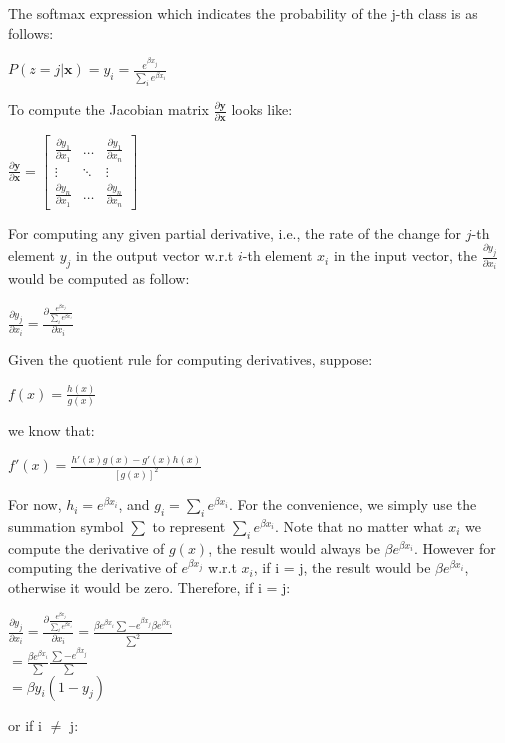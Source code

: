 \documentclass[12pt]{article}
\begin{document}
The softmax expression which indicates the probability of the j-th class is as follows:
\begin{center}
    $P(z=j|\mathbf{x}) = y_{i} = \frac{e^{\beta x_{j}}}{\sum_{i}e^{\beta x_{i}}}$
\end{center}To compute the Jacobian matrix $\frac{\partial \mathbf{y}}{\partial \mathbf{x}}$ looks like:
\begin{center}
    $
    \frac{\partial \mathbf{y}}{\partial \mathbf{x}}=
        \left[\begin{matrix}
        \frac{\partial y_{1}}{\partial x_{1}} & \dots & \frac{\partial y_{1}}{\partial x_{n}} \\
        \vdots & \ddots & \vdots \\
        \frac{\partial y_{n}}{\partial x_{1}} & \dots & \frac{\partial y_{n}}{\partial x_{n}}
        \end{matrix}\right]
    $
\end{center}For computing any given partial derivative, i.e., the rate of the change for $j$-th element $y_{j}$ in the output vector w.r.t $i$-th element $x_{i}$ in the input vector, the $\frac{\partial y_{j}}{\partial x_{i}}$ would be computed as follow:
\begin{center}
    $
    \frac{\partial y_{j}}{\partial x_{i}}=
    \frac{\partial \frac{e^{\beta x_{j}}}{\sum_{i}e^{\beta x_{i}}}}{\partial x_{i}}
    $
\end{center}Given the quotient rule for computing derivatives, suppose:
\begin{center}
    $
    f(x) = \frac{h(x)}{g(x)}
    $
\end{center}we know that:
\begin{center}
    $
    f'(x) = \frac{h'(x)g(x)-g'(x)h(x)}{[g(x)]^2}
    $
\end{center}For now, $h_i = e^{\beta x_{i}}$, and $g_i = \sum_{i}e^{\beta x_{i}}$. For the convenience, we simply use the summation symbol $\sum$ to represent $\sum_{i}e^{\beta x_{i}}$. Note that no matter what $x_{i}$ we compute the derivative of $g(x)$, the result would always be $\beta e^{\beta x_{i}}$. However for computing the derivative of $e^{\beta x_{j}}$ w.r.t $x_{i}$, if i = j, the result would be $\beta e^{\beta x_{i}}$, otherwise it would be zero.
\newline\indent Therefore, if i = j:
\begin{center}
    $
    \frac{\partial y_{j}}{\partial x_{i}}=
    \frac{\partial \frac{e^{\beta x_{j}}}{\sum_{i}e^{\beta x_{i}}}}{\partial x_{i}}=
    \frac{\beta e^{\beta x_{i}}\sum - e^{\beta x_{j}}\beta e^{\beta x_{i}}}{\sum^2}
    $\\
    $
    =\frac{\beta e^{\beta x_{i}}}{\sum}\frac{\sum - e^{\beta x_{j}}}{\sum}
    $\\
    $
    = \beta y_{i}(1-y_{j})
    $
\end{center}or if i $\neq$ j:
\end{document}
